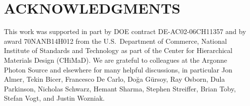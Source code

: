 \documentclass{aip-cp}
\begin{document}
\section{ACKNOWLEDGMENTS}

This work was supported in part by DOE contract DE-AC02-06CH11357 and by award 70NANB14H012 from the U.S.\  Department of Commerce, National Institute of Standards and Technology as part of the Center for Hierarchical Materials Design (CHiMaD).
We are grateful to colleagues at the Argonne Photon Source and elsewhere
for many helpful discussions, in particular Jon Almer, Tekin Bicer, Francesco De Carlo, Do{\u{g}}a G{\"u}rsoy, Ray Osborn, Dula Parkinson, Nicholas Schwarz, Hemant Sharma, Stephen Streiffer, Brian Toby, Stefan Vogt, and Justin Wozniak.


\nocite{*}
%
%
\end{document}
